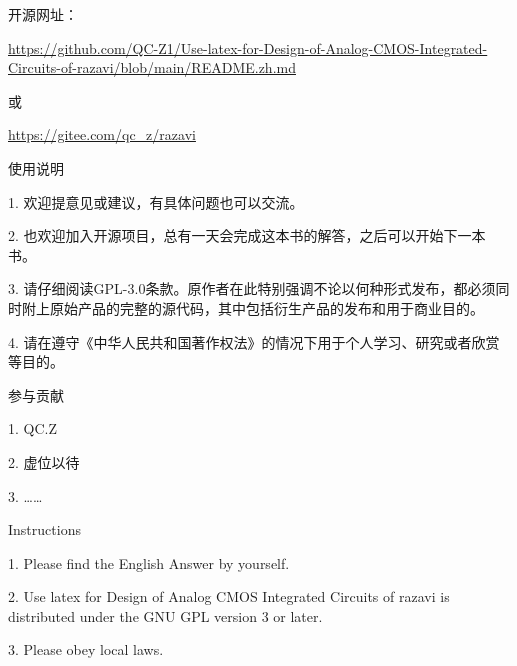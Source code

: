 


开源网址：

\url{https://github.com/QC-Z1/Use-latex-for-Design-of-Analog-CMOS-Integrated-Circuits-of-razavi/blob/main/README.zh.md}

或

\url{https://gitee.com/qc_z/razavi}


 使用说明

1.  欢迎提意见或建议，有具体问题也可以交流。

2.  也欢迎加入开源项目，总有一天会完成这本书的解答，之后可以开始下一本书。

3.  请仔细阅读GPL-3.0条款。原作者在此特别强调不论以何种形式发布，都必须同时附上原始产品的完整的源代码，其中包括衍生产品的发布和用于商业目的。

4.  请在遵守《中华人民共和国著作权法》的情况下用于个人学习、研究或者欣赏等目的。

 参与贡献

1.  QC.Z

2.  虚位以待

3.  ……

 Instructions

1.  Please find the English Answer by yourself.

2.  Use latex for Design of Analog CMOS Integrated Circuits of razavi is distributed under the GNU GPL version 3 or later.

3.  Please obey local laws.